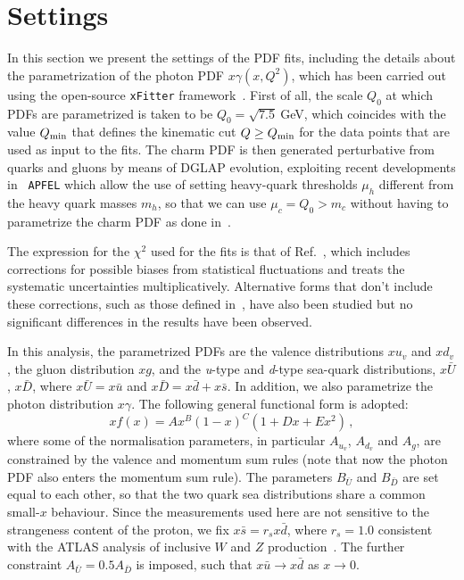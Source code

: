 \section{Settings}
\label{sec:fitsettings}

In this section we present the settings of the PDF fits, including the details about the
parametrization of the photon PDF $x\gamma(x,Q^2)$, which has been
carried out using the open-source {\tt xFitter}
framework~\cite{Alekhin:2014irh}.
%
First of all, the scale $Q_0$ at which PDFs are parametrized is taken to be
$Q_0 = \sqrt{7.5}~$GeV, which coincides with the value $Q_{\rm min}$ that defines
the kinematic cut $Q \ge Q_{\rm min}$ for the
data points that are used as input to the fits.
%
The charm PDF is then generated perturbative from quarks and gluons by
means of DGLAP evolution, exploiting recent developments in {\tt
  APFEL} which allow the use of setting heavy-quark thresholds $\mu_h$
different from the heavy quark masses $m_h$, so that we can use
$\mu_c=Q_0 > m_c$ without having to parametrize the charm PDF as done in~\cite{Ball:2016neh}.

The expression for the $\chi^2$ used for the fits is that
of Ref.~\cite{Aaron:2012qi}, which
includes corrections for possible 
biases from statistical fluctuations and treats the systematic uncertainties
multiplicatively.
%
Alternative forms that don't include these corrections, such as those
defined in~\cite{Aaron:2009aa,Abramowicz:2015mha},
have also been studied but no significant differences
in the results have been observed.
%

In this analysis, the parametrized PDFs are the valence distributions
$xu_{v}$ and $xd_{v}$, the gluon distribution $xg$, and the
\textit{u}-type and \textit{d}-type sea-quark distributions,
$x\bar{U}$, $x\bar{D}$, where $x\bar{U} = x\bar{u}$ and
$x\bar{D} = x\bar{d} + x\bar{s}$.
%
In addition, we also parametrize the photon distribution $x\gamma$.
%
The following general functional form is adopted:
\begin{equation}
  \label{eq:parametrization}
xf(x) = Ax^{B}(1-x)^{C}(1+Dx+Ex^{2}) \, ,
\end{equation}
where some of the normalisation parameters, in particular $A_{u_{v}}$,
$A_{d_{v}}$ and $A_{g}$, are constrained by the valence and momentum
sum rules (note that now the photon PDF also enters the momentum sum rule).
%
The parameters $B_{\bar{U}}$ and $B_{\bar{D}}$ are set equal to each
other, so that the two quark sea distributions share a common
small-$x$ behaviour.
%
Since the measurements used here are not sensitive to the strangeness
content of the proton, we fix $x\bar{s} = r_sx\bar{d}$, where
$r_s=1.0$ consistent with the ATLAS analysis of inclusive $W$
and $Z$ production~\cite{Aad:2012sb,Aaboud:2016btc}.
%
The further constraint $A_{\bar{U}} = 0.5 A_{\bar{D}}$ is imposed,
such that $x\bar{u} \to x\bar{d}$ as $x \to 0$.  

